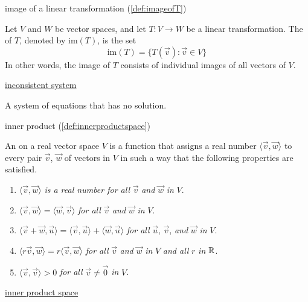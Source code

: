 \documentclass{ximera}
\begin{document}
image of a linear transformation (\ref{def:imageofT})
\begin{expandable}{}{}
    Let $V$ and $W$ be vector spaces, and let $T:V\rightarrow W$ be a linear transformation.  The  of $T$, denoted by $\mbox{im}(T)$, is the set
$$\mbox{im}(T)=\{T(\vec{v}):\vec{v}\in V\}$$
In other words, the image of $T$ consists of individual images of all vectors of $V$.
\end{expandable}

\href{https://ximera.osu.edu/linearalgebradzv3/LinearAlgebraInteractiveIntro/SYS-0010/main}{inconsistent system}
\begin{expandable}{}{}
    A system of equations that has no solution.
\end{expandable}

inner product (\ref{def:innerproductspace})
\begin{expandable}{}{}
    An  on a real vector space $V$ is a function that assigns a real number $\langle\vec{v}, \vec{w}\rangle$ to every pair $\vec{v}$, $\vec{w}$ of vectors in $V$ in such a way that the following properties are satisfied.

\begin{enumerate}
\item  $\langle\vec{v}, \vec{w}\rangle$ \textit{is a real number for all} $\vec{v}$ \textit{and} $\vec{w}$ \textit{in} $V$.

\item  $\langle\vec{v}, \vec{w}\rangle = \langle\vec{w}, \vec{v}\rangle$ \textit{for all} $\vec{v}$ \textit{and} $\vec{w}$ \textit{in} $V$.

\item  $\langle\vec{v} + \vec{w}, \vec{u}\rangle = \langle\vec{v}, \vec{u}\rangle + \langle\vec{w}, \vec{u}\rangle$ \textit{for all} $\vec{u}$, $\vec{v}$, \textit{and} $\vec{w}$ \textit{in} $V$.

\item $\langle r\vec{v}, \vec{w}\rangle = r\langle\vec{v}, \vec{w}\rangle$ \textit{for all} $\vec{v}$ \textit{and} $\vec{w}$ \textit{in} $V$ \textit{and all} $r$ \textit{in} $\mathbb{R}$.

\item  $\langle\vec{v}, \vec{v}\rangle > 0$ \textit{for all} $\vec{v} \neq \vec{0}$ \textit{in} $V$.

\end{enumerate}
\end{expandable}

\href{https://ximera.osu.edu/linearalgebradzv3/LinearAlgebraInteractiveIntro/VSP-0070/main}{inner product space}
\end{document}
